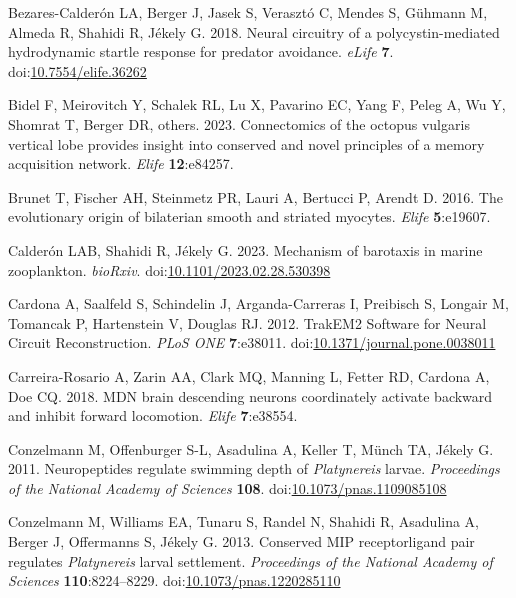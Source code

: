 \documentclass[
  11pt,
]{article}
\newlength{\cslhangindent}
\newenvironment{CSLReferences}[2] %
 {\begin{list}{}{%
  \setlength{\itemindent}{0pt}
  \setlength{\leftmargin}{0pt}
  \setlength{\parsep}{0pt}
  \ifodd #1
   \setlength{\leftmargin}{\cslhangindent}
   \setlength{\itemindent}{-1\cslhangindent}
  \fi
  \setlength{\itemsep}{#2\baselineskip}}}
 {\end{list}}
\begin{document}
\begin{CSLReferences}{1}{0}
Bezares-Calderón LA, Berger J, Jasek S, Verasztó C, Mendes S, Gühmann M,
Almeda R, Shahidi R, Jékely G. 2018. Neural circuitry of a
polycystin-mediated hydrodynamic startle response for predator
avoidance. \emph{eLife} \textbf{7}.
doi:\href{https://doi.org/10.7554/elife.36262}{10.7554/elife.36262}

Bidel F, Meirovitch Y, Schalek RL, Lu X, Pavarino EC, Yang F, Peleg A,
Wu Y, Shomrat T, Berger DR, others. 2023. Connectomics of the octopus
vulgaris vertical lobe provides insight into conserved and novel
principles of a memory acquisition network. \emph{Elife}
\textbf{12}:e84257.

Brunet T, Fischer AH, Steinmetz PR, Lauri A, Bertucci P, Arendt D. 2016.
The evolutionary origin of bilaterian smooth and striated myocytes.
\emph{Elife} \textbf{5}:e19607.

Calderón LAB, Shahidi R, Jékely G. 2023. Mechanism of barotaxis in
marine zooplankton. \emph{bioRxiv}.
doi:\href{https://doi.org/10.1101/2023.02.28.530398}{10.1101/2023.02.28.530398}

Cardona A, Saalfeld S, Schindelin J, Arganda-Carreras I, Preibisch S,
Longair M, Tomancak P, Hartenstein V, Douglas RJ. 2012. TrakEM2 Software
for Neural Circuit Reconstruction. \emph{PLoS ONE} \textbf{7}:e38011.
doi:\href{https://doi.org/10.1371/journal.pone.0038011}{10.1371/journal.pone.0038011}

Carreira-Rosario A, Zarin AA, Clark MQ, Manning L, Fetter RD, Cardona A,
Doe CQ. 2018. MDN brain descending neurons coordinately activate
backward and inhibit forward locomotion. \emph{Elife} \textbf{7}:e38554.

Conzelmann M, Offenburger S-L, Asadulina A, Keller T, Münch TA, Jékely
G. 2011. Neuropeptides regulate swimming depth of {\emph{Platynereis}}
larvae. \emph{Proceedings of the National Academy of Sciences}
\textbf{108}.
doi:\href{https://doi.org/10.1073/pnas.1109085108}{10.1073/pnas.1109085108}

Conzelmann M, Williams EA, Tunaru S, Randel N, Shahidi R, Asadulina A,
Berger J, Offermanns S, Jékely G. 2013. Conserved MIP
receptor{\textendash}ligand pair regulates {\emph{Platynereis}} larval
settlement. \emph{Proceedings of the National Academy of Sciences}
\textbf{110}:8224--8229.
doi:\href{https://doi.org/10.1073/pnas.1220285110}{10.1073/pnas.1220285110}


\end{CSLReferences}
\end{document}
